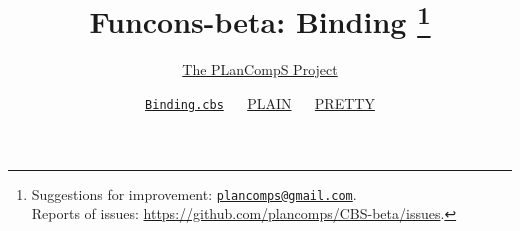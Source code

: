 \documentclass[fleqn]{article}
\title{Funcons-beta: Binding \footnote{
    Suggestions for improvement: \href{mailto:plancomps@gmail.com}{\texttt{plancomps@gmail.com}}.\\
    Reports of issues: \url{https://github.com/plancomps/CBS-beta/issues}.}}
\author{\href{https://plancomps.github.io}{The PLanCompS Project}}
\date{
  \href{https://github.com/plancomps/CBS-beta/blob/math/Funcons-beta/Computations/Normal/Binding/Binding.cbs}{\texttt{Binding.cbs}} ~\textbar~
  \href{/CBS-beta/docs/Funcons-beta/Computations/Normal/Binding/index.html}{PLAIN} ~\textbar~
  \href{/CBS-beta/math/Funcons-beta/Computations/Normal/Binding/index.html}{PRETTY}          
}
\begin{document}
\maketitle
\makeatletter

\end{document}
